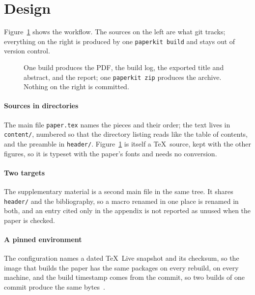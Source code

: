 \section{Design}
\label{sec:design}

Figure~\ref{fig:overview} shows the workflow. The sources on the left are what
git tracks; everything on the right is produced by one \texttt{paperkit build}
and stays out of version control.

\begin{figure}[t]
  \centering
  
  \caption{One build produces the PDF, the build log, the exported title and
  abstract, and the report; one \texttt{paperkit zip} produces the archive.
  Nothing on the right is committed.}
  \label{fig:overview}
\end{figure}

\paragraph{Sources in directories}
The main file \texttt{paper.tex} names the pieces and their order; the text
lives in \texttt{content/}, numbered so that the directory listing reads like
the table of contents, and the preamble in \texttt{header/}.
Figure~\ref{fig:overview} is itself a \TeX\ source, kept with the other
figures, so it is typeset with the paper's fonts and needs no conversion.

\paragraph{Two targets}
The supplementary material is a second main file in the same tree. It shares
\texttt{header/} and the bibliography, so a macro renamed in one place is
renamed in both, and an entry cited only in the appendix is not reported as
unused when the paper is checked.

\paragraph{A pinned environment}
The configuration names a dated \TeX\ Live snapshot and its checksum, so the
image that builds the paper has the same packages on every rebuild, on every
machine, and the build timestamp comes from the commit, so two builds of one
commit produce the same bytes~\cite{reproducible}.
